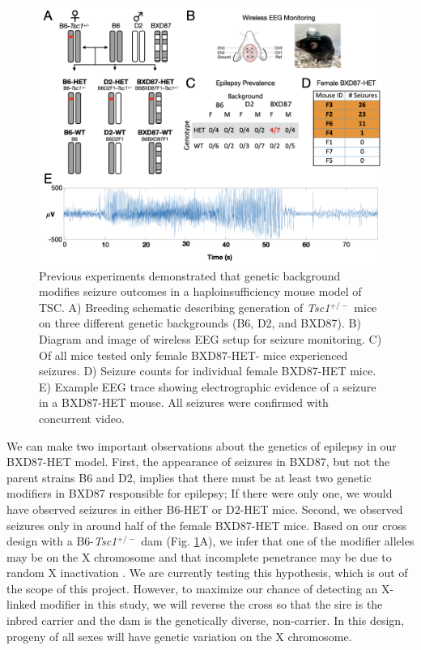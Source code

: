 \documentclass[
  12pt,
]{article}
\begin{document}
\begin{figure}[ht!]
\includegraphics[width=\textwidth]{Fig2.png} 
\caption{Previous experiments demonstrated that genetic background modifies seizure outcomes in a haploinsufficiency mouse model of TSC. A) Breeding schematic describing generation of \textit{Tsc1}$^{+/-}$ mice on three different genetic backgrounds (B6, D2, and BXD87). B) Diagram and image of wireless EEG setup for seizure monitoring. C) Of all mice tested only female BXD87-HET- mice experienced seizures. D) Seizure counts for individual female BXD87-HET mice. E) Example EEG trace showing electrographic evidence of a seizure in a BXD87-HET mouse. All seizures were confirmed with concurrent video.
}
\label{fig:bxd}
\end{figure}

We can make two important observations about the genetics of epilepsy in
our BXD87-HET model. First, the appearance of seizures in BXD87, but not
the parent strains B6 and D2, implies that there must be at least two
genetic modifiers in BXD87 responsible for epilepsy; If there were only
one, we would have observed seizures in either B6-HET or D2-HET mice.
Second, we observed seizures only in around half of the female BXD87-HET
mice. Based on our cross design with a B6-\textit{Tsc1}\(^{+/-}\) dam
(Fig. \ref{fig:bxd}A), we infer that one of the modifier alleles may be
on the X chromosome and that incomplete penetrance may be due to random
X inactivation \cite{15818384, 9618446}. We are currently testing this
hypothesis, which is out of the scope of this project. However, to
maximize our chance of detecting an X-linked modifier in this study, we
will reverse the cross so that the sire is the inbred carrier and the
dam is the genetically diverse, non-carrier. In this design, progeny of
all sexes will have genetic variation on the X chromosome.
\end{document}
